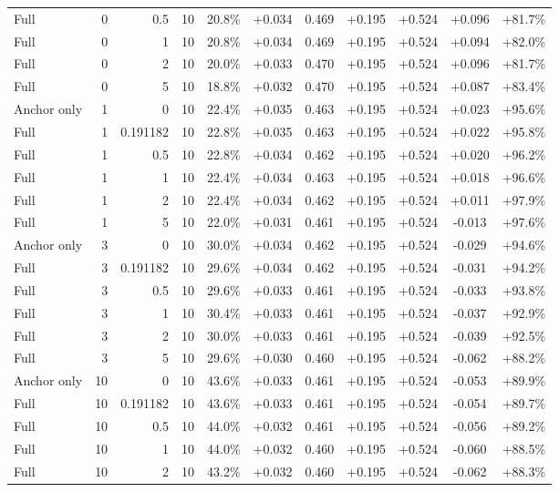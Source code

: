 \begin{table}[htbp]
\begin{tabular}{lrrrccccccc}
Full & 0 & 0.5 & 10 & 20.8\% & +0.034 & 0.469 & +0.195 & +0.524 & +0.096 & +81.7\% \\
Full & 0 & 1 & 10 & 20.8\% & +0.034 & 0.469 & +0.195 & +0.524 & +0.094 & +82.0\% \\
Full & 0 & 2 & 10 & 20.0\% & +0.033 & 0.470 & +0.195 & +0.524 & +0.096 & +81.7\% \\
Full & 0 & 5 & 10 & 18.8\% & +0.032 & 0.470 & +0.195 & +0.524 & +0.087 & +83.4\% \\
Anchor only & 1 & 0 & 10 & 22.4\% & +0.035 & 0.463 & +0.195 & +0.524 & +0.023 & +95.6\% \\
Full & 1 & 0.191182 & 10 & 22.8\% & +0.035 & 0.463 & +0.195 & +0.524 & +0.022 & +95.8\% \\
Full & 1 & 0.5 & 10 & 22.8\% & +0.034 & 0.462 & +0.195 & +0.524 & +0.020 & +96.2\% \\
Full & 1 & 1 & 10 & 22.4\% & +0.034 & 0.463 & +0.195 & +0.524 & +0.018 & +96.6\% \\
Full & 1 & 2 & 10 & 22.4\% & +0.034 & 0.462 & +0.195 & +0.524 & +0.011 & +97.9\% \\
Full & 1 & 5 & 10 & 22.0\% & +0.031 & 0.461 & +0.195 & +0.524 & -0.013 & +97.6\% \\
Anchor only & 3 & 0 & 10 & 30.0\% & +0.034 & 0.462 & +0.195 & +0.524 & -0.029 & +94.6\% \\
Full & 3 & 0.191182 & 10 & 29.6\% & +0.034 & 0.462 & +0.195 & +0.524 & -0.031 & +94.2\% \\
Full & 3 & 0.5 & 10 & 29.6\% & +0.033 & 0.461 & +0.195 & +0.524 & -0.033 & +93.8\% \\
Full & 3 & 1 & 10 & 30.4\% & +0.033 & 0.461 & +0.195 & +0.524 & -0.037 & +92.9\% \\
Full & 3 & 2 & 10 & 30.0\% & +0.033 & 0.461 & +0.195 & +0.524 & -0.039 & +92.5\% \\
Full & 3 & 5 & 10 & 29.6\% & +0.030 & 0.460 & +0.195 & +0.524 & -0.062 & +88.2\% \\
Anchor only & 10 & 0 & 10 & 43.6\% & +0.033 & 0.461 & +0.195 & +0.524 & -0.053 & +89.9\% \\
Full & 10 & 0.191182 & 10 & 43.6\% & +0.033 & 0.461 & +0.195 & +0.524 & -0.054 & +89.7\% \\
Full & 10 & 0.5 & 10 & 44.0\% & +0.032 & 0.461 & +0.195 & +0.524 & -0.056 & +89.2\% \\
Full & 10 & 1 & 10 & 44.0\% & +0.032 & 0.460 & +0.195 & +0.524 & -0.060 & +88.5\% \\
Full & 10 & 2 & 10 & 43.2\% & +0.032 & 0.460 & +0.195 & +0.524 & -0.062 & +88.3\% \\

\end{tabular}
\end{table}
